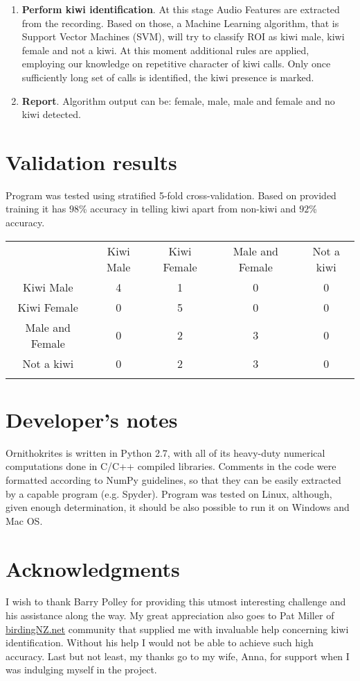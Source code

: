 \documentclass[paper=a4, fontsize=11pt]{scrartcl}	%
\numberwithin{equation}{section}		%
\numberwithin{figure}{section}			%
\numberwithin{table}{section}				%
\begin{document}
\begin{enumerate}
	\item \textbf{Perform kiwi identification}. At this stage Audio Features are extracted from the recording. Based on those, a Machine Learning algorithm, that is Support Vector Machines (SVM), will try to classify ROI as kiwi male, kiwi female and not a kiwi. At this moment additional rules are applied, employing our knowledge on repetitive character of kiwi calls. Only once sufficiently long set of calls is identified, the kiwi presence is marked. 
	\item \textbf{Report}. Algorithm output can be: female, male, male and female and no kiwi detected.
\end{enumerate}

\section{Validation results}
Program was tested using stratified 5-fold cross-validation. Based on provided training it has $98$\% accuracy in telling kiwi apart from non-kiwi and $92$\% accuracy.
\begin{table}[hp]
\begin{tabularx}{.7\textwidth}{c|c c c c |}
 & Kiwi Male & Kiwi Female & Male and Female & \multicolumn{1}{c}{Not a kiwi} \\
\hhline{-----}
Kiwi Male & 4 \cellcolor[gray]{.8}& 1 & 0 & 0 \\
Kiwi Female & 0 & 5 \cellcolor[gray]{.8}& 0 & 0 \\
Male and Female & 0 & 2 & 3 \cellcolor[gray]{.8} & 0 \\
Not a kiwi & 0 & 2 & 3 & 0 \cellcolor[gray]{.8} \\
\hhline{~----}
\end{tabularx}
\end{table}

\section{Developer's notes}
Ornithokrites is written in Python 2.7, with all of its heavy-duty numerical computations done in C/C++ compiled libraries. Comments in the code were formatted according to NumPy guidelines, so that they can be easily extracted by a capable program (e.g. Spyder). Program was tested on Linux, although, given enough determination, it should be also possible to run it on Windows and Mac OS. 

\section{Acknowledgments}
I wish to thank Barry Polley for providing this utmost interesting challenge and his assistance along the way. My great appreciation also goes to Pat Miller of \url{birdingNZ.net} community that supplied me with invaluable help concerning kiwi identification. Without his help I would not be able to achieve such high accuracy. Last but not least, my thanks go to my wife, Anna, for support when I was indulging myself in the project.

\end{document}
